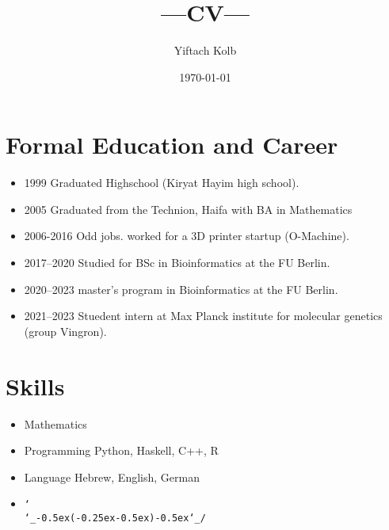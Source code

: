\documentclass[a4paper,10pt]{article}
\def\shrug{\texttt{\raisebox{0.75em}{\char`\_}\char`\\\char`\_\kern-0.5ex(\kern-0.25ex\raisebox{0.25ex}{\rotatebox{45}{\raisebox{-.75ex}"\kern-1.5ex\rotatebox{-90})}}\kern-0.5ex)\kern-0.5ex\char`\_/\raisebox{0.75em}{\char`\_}}}
\begin{document}




\title{---CV---}
\author{Yiftach Kolb}
\date{\today}

\maketitle

\section*{Formal Education and Career}

\begin{itemize}
\item{1999} Graduated Highschool (Kiryat Hayim high school).
\item{2005} Graduated from the Technion, Haifa with BA in Mathematics
\item{2006-2016} Odd jobs.
worked for a 3D printer startup (O-Machine).
\item{2017--2020} Studied for BSc in Bioinformatics at the FU Berlin.
\item{2020--2023} master's program in Bioinformatics at the FU Berlin.
\item{2021--2023} Stuedent intern at Max Planck institute for molecular genetics (group Vingron).
\end{itemize}

\section*{Skills}
\begin{itemize}
\item{Mathematics}
\item{Programming}
\subitem{} Python, Haskell, C++, R
\item{Language}
\subitem{} Hebrew, English, German
\item{}
\subitem{}
\normalsize\shrug


\end{itemize}



\nocite{mpgvaeRepo}
\nocite{mg22Repo}
\printbibliography
\end{document}
